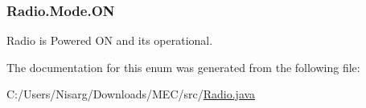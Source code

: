 \subsubsection[{O\+N}]{\setlength{\rightskip}{0pt plus 5cm}Radio.\+Mode.\+O\+N}\label{enum_radio_1_1_mode_aab005e1aab4f9ae40cb5bcdcbb0be43b}


Radio is Powered O\+N and its operational. 



The documentation for this enum was generated from the following file\+:\begin{DoxyCompactItemize}
\item 
C\+:/\+Users/\+Nisarg/\+Downloads/\+M\+E\+C/src/\hyperlink{_radio_8java}{Radio.\+java}\end{DoxyCompactItemize}
